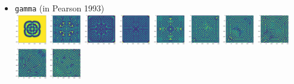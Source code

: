 \begin{itemize}
\item {\tt gamma} (in Pearson 1993)\\
\includegraphics[width=1.4cm]{python_codes/fieldstone_171/pearson93/gamma_solution_0001000_u}
\includegraphics[width=1.4cm]{python_codes/fieldstone_171/pearson93/gamma_solution_0005000_u}
\includegraphics[width=1.4cm]{python_codes/fieldstone_171/pearson93/gamma_solution_0010000_u}
\includegraphics[width=1.4cm]{python_codes/fieldstone_171/pearson93/gamma_solution_0015000_u}
\includegraphics[width=1.4cm]{python_codes/fieldstone_171/pearson93/gamma_solution_0020000_u}
\includegraphics[width=1.4cm]{python_codes/fieldstone_171/pearson93/gamma_solution_0030000_u}
\includegraphics[width=1.4cm]{python_codes/fieldstone_171/pearson93/gamma_solution_0040000_u}
\includegraphics[width=1.4cm]{python_codes/fieldstone_171/pearson93/gamma_solution_0050000_u}
\includegraphics[width=1.4cm]{python_codes/fieldstone_171/pearson93/gamma_solution_0075000_u}
\includegraphics[width=1.4cm]{python_codes/fieldstone_171/pearson93/gamma_solution_final_u}



\end{itemize}
